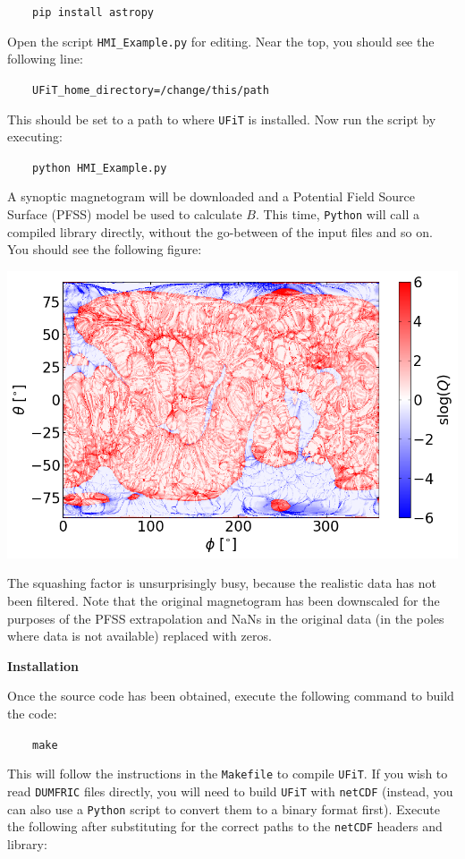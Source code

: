 \documentclass[12pt,twoside]{article}
\begin{document}
$\quad\quad$\texttt{pip install astropy}

Open the script \texttt{HMI\_Example.py} for editing. Near the top, you should see the following line:

$\quad\quad$\texttt{UFiT\_home\_directory=\textquotesingle /change/this/path\textquotesingle }

This should be set to a path to where \texttt{UFiT} is installed. Now run the script by executing: 

$\quad\quad$\texttt{python HMI\_Example.py}

A synoptic magnetogram will be downloaded and a Potential Field Source Surface (PFSS) model be used to calculate $B$. This time, \texttt{Python} will call a compiled library directly, without the go-between of the input files and so on. You should see the following figure:

\begin{center}
\includegraphics[scale=0.6]{HMI_Example.png}
\end{center}

The squashing factor is unsurprisingly busy, because the realistic data has not been filtered. Note that the original magnetogram has been downscaled for the purposes of the PFSS extrapolation and NaNs in the original data (in the poles where data is not available) replaced with zeros.


\vspace{2mm}
{\Large \textbf{Installation}}

Once the source code has been obtained, execute the following command to build the code:

$\quad\quad$\texttt{make}

This will follow the instructions in the \texttt{Makefile} to compile \texttt{UFiT}. If you wish to read \texttt{DUMFRIC} files directly, you will need to build \texttt{UFiT} with \texttt{netCDF} (instead, you can also use a \texttt{Python} script to convert them to a binary format first). Execute the following after substituting for the correct paths to the \texttt{netCDF} headers and library:
\end{document}
